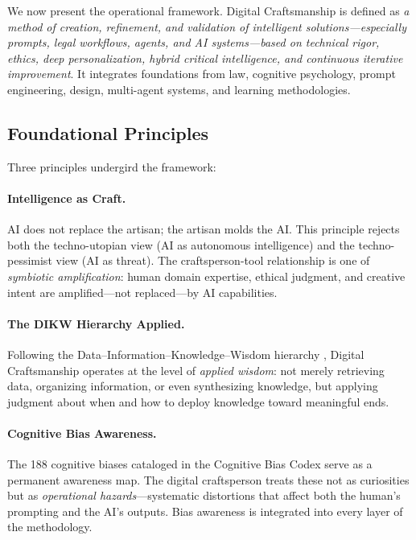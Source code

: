 \documentclass[11pt,a4paper]{article}
\begin{document}
We now present the operational framework. Digital Craftsmanship is defined as \emph{a method of creation, refinement, and validation of intelligent solutions---especially prompts, legal workflows, agents, and AI systems---based on technical rigor, ethics, deep personalization, hybrid critical intelligence, and continuous iterative improvement}. It integrates foundations from law, cognitive psychology, prompt engineering, design, multi-agent systems, and learning methodologies.

\subsection{Foundational Principles}

Three principles undergird the framework:

\paragraph{Intelligence as Craft.} AI does not replace the artisan; the artisan molds the AI. This principle rejects both the techno-utopian view (AI as autonomous intelligence) and the techno-pessimist view (AI as threat). The craftsperson-tool relationship is one of \emph{symbiotic amplification}: human domain expertise, ethical judgment, and creative intent are amplified---not replaced---by AI capabilities.

\paragraph{The DIKW Hierarchy Applied.} Following the Data--Information--Knowledge--Wisdom hierarchy \citep{ackoff1989data}, Digital Craftsmanship operates at the level of \emph{applied wisdom}: not merely retrieving data, organizing information, or even synthesizing knowledge, but applying judgment about when and how to deploy knowledge toward meaningful ends.

\paragraph{Cognitive Bias Awareness.} The 188 cognitive biases cataloged in the Cognitive Bias Codex \citep{benson2016cognitive} serve as a permanent awareness map. The digital craftsperson treats these not as curiosities but as \emph{operational hazards}---systematic distortions that affect both the human's prompting and the AI's outputs. Bias awareness is integrated into every layer of the methodology.
\end{document}
